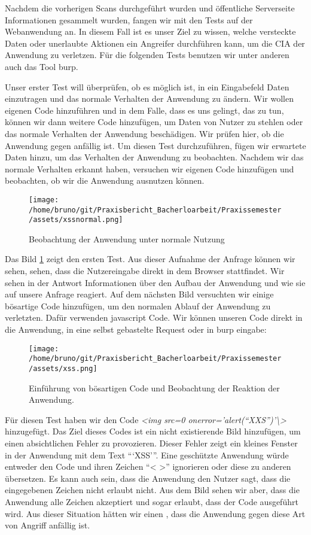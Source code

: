 Nachdem die vorherigen Scans durchgeführt wurden und öffentliche Serverseite Informationen gesammelt wurden, fangen wir mit den Tests auf der Webanwendung an. In diesem Fall ist es unser Ziel zu wissen, welche versteckte Daten oder unerlaubte Aktionen ein Angreifer durchführen kann, um die \gls{CIA} der Anwendung zu verletzen. Für die folgenden Tests benutzen wir unter anderen auch das Tool \gls{burp}.

Unser erster Test will überprüfen, ob es möglich ist, in ein Eingabefeld Daten einzutragen und das normale Verhalten der Anwendung zu ändern. Wir wollen eigenen Code hinzuführen und in dem Falle, dass es uns gelingt, das zu tun, können wir dann weitere Code hinzufügen, um Daten von Nutzer zu stehlen oder das normale Verhalten der Anwendung beschädigen. Wir prüfen hier, ob die Anwendung gegen  anfällig ist. Um diesen Test durchzuführen, fügen wir erwartete Daten hinzu, um das Verhalten der Anwendung zu beobachten. Nachdem wir das normale Verhalten erkannt haben, versuchen wir eigenen Code hinzufügen und beobachten, ob wir die Anwendung ausnutzen können. 

\begin{figure}[H]
    \centering
    \texttt{[image: /home/bruno/git/Praxisbericht\_Bacherloarbeit/Praxissemester/assets/xssnormal.png]}
    \caption{Beobachtung der Anwendung unter normale Nutzung}
    \label{fig:xssnormal}
    \centering
\end{figure}

Das Bild \ref{fig:xssnormal} zeigt den ersten Test. Aus dieser Aufnahme der Anfrage können wir sehen, sehen, dass die Nutzereingabe direkt in dem Browser stattfindet. Wir sehen in der Antwort Informationen über den Aufbau der Anwendung und wie sie auf unsere Anfrage reagiert. Auf dem nächsten Bild versuchten wir einige bösartige Code hinzufügen, um den normalen Ablauf der Anwendung zu verletzten. Dafür verwenden \gls{javascript} Code. Wir können unseren Code direkt in die Anwendung, in eine selbst gebastelte Request oder in \gls{burp} eingabe:

\begin{figure}[H]
    \centering
    \texttt{[image: /home/bruno/git/Praxisbericht\_Bacherloarbeit/Praxissemester/assets/xss.png]}
    \caption{Einführung von bösartigen Code und Beobachtung der Reaktion der Anwendung.}
    \label{fig:xssexecuted}
    \centering
\end{figure}

Für diesen Test haben wir den Code \textit{<img src=0 onerror='alert(``XXS'')'\textbackslash>} hinzugefügt. Das Ziel dieses Codes ist ein nicht existierende Bild hinzufügen, um einen absichtlichen Fehler zu provozieren. Dieser Fehler zeigt ein kleines Fenster in der Anwendung mit dem Text ```XSS'''. Eine geschützte Anwendung würde entweder den Code und ihren Zeichen ``< >'' ignorieren oder diese zu anderen übersetzen. Es kann auch sein, dass die Anwendung den Nutzer sagt, dass die eingegebenen Zeichen nicht erlaubt nicht. Aus dem Bild sehen wir aber, dass die Anwendung alle Zeichen akzeptiert und sogar erlaubt, dass der Code ausgeführt wird. Aus dieser Situation hätten wir einen , dass die Anwendung gegen diese Art von Angriff anfällig ist.



